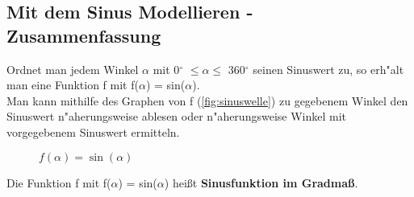 \documentclass{standalone}
\begin{document}
\subsection{Mit dem Sinus Modellieren - Zusammenfassung}
Ordnet man jedem Winkel $\alpha$ mit 0$^\circ$  $\leq \alpha \leq$ 360$^\circ$  seinen Sinuswert zu, so erh{"a}lt man eine Funktion f mit f($\alpha$) = sin($\alpha$).\\
Man kann mithilfe des Graphen von f (\autoref{fig:sinuswelle}) zu gegebenem Winkel den Sinuswert n{"a}herungsweise ablesen oder n{"a}herungsweise Winkel mit vorgegebenem Sinuswert ermitteln.

\begin{figure}[hb!]
  \center
  \def\svgwidth{500px}
  
  \caption{$f(\alpha) = \sin(\alpha)$}
  \label{fig:sinuswelle}
\end{figure}

Die Funktion f mit f($\alpha$) = sin($\alpha$) hei{\ss}t \textbf{Sinusfunktion im Gradma{\ss}}.
\end{document}
